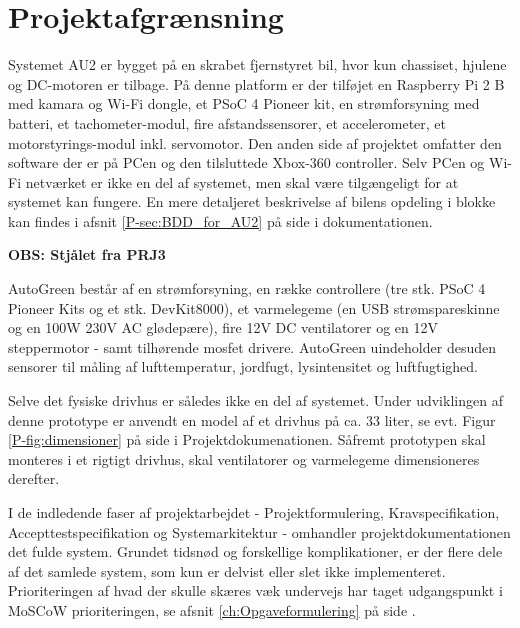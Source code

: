 \chapter{Projektafgrænsning} \label{ch:Projektafgraensning}

Systemet AU2 er bygget på en skrabet fjernstyret bil, hvor kun chassiset, hjulene og DC-motoren er tilbage. 
På denne platform er der tilføjet en Raspberry Pi 2 B med kamara og Wi-Fi dongle, et PSoC 4 Pioneer kit, en strømforsyning med batteri, et tachometer-modul, fire afstandssensorer, et accelerometer, et motorstyrings-modul inkl. servomotor. 
Den anden side af projektet omfatter den software der er på PCen og den tilsluttede Xbox-360 controller. 
Selv PCen og Wi-Fi netværket er ikke en del af systemet, men skal være tilgængeligt for at systemet kan fungere. 
En mere detaljeret beskrivelse af bilens opdeling i blokke kan findes i afsnit \ref{P-sec:BDD_for_AU2}  på side \pageref{P-sec:BDD_for_AU2} i dokumentationen. \newline


\textbf{OBS: Stjålet fra PRJ3}

AutoGreen består af en strømforsyning, en række controllere (tre stk. PSoC 4 Pioneer Kits og et stk. DevKit8000), et varmelegeme (en USB strømspareskinne og en 100W 230V AC glødepære), fire 12V DC ventilatorer og en 12V steppermotor - samt tilhørende mosfet drivere. 
AutoGreen uindeholder desuden sensorer til måling af lufttemperatur, jordfugt, lysintensitet og luftfugtighed.

Selve det fysiske drivhus er således ikke en del af systemet. 
Under udviklingen af denne prototype er anvendt en model af et drivhus på ca. 33 liter, se evt. Figur \ref{P-fig:dimensioner} på side \pageref{P-fig:dimensioner} i Projektdokumenationen. 
Såfremt prototypen skal monteres i et rigtigt drivhus, skal ventilatorer og varmelegeme dimensioneres derefter.

\mbox{}

I de indledende faser af projektarbejdet - Projektformulering, Kravspecifikation, Accepttestspecifikation og Systemarkitektur - omhandler projektdokumentationen det fulde system.
Grundet tidsnød og forskellige komplikationer, er der flere dele af det samlede system, som kun er delvist eller slet ikke implementeret.
Prioriteringen af hvad der skulle skæres væk undervejs har taget udgangspunkt i MoSCoW prioriteringen, se afsnit \ref{ch:Opgaveformulering}  på side \pageref{ch:Opgaveformulering}.

